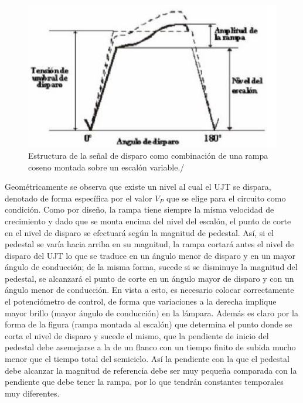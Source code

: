 \documentclass{article}
\begin{document}
\begin{figure}[h]
 \begin{center}
	\includegraphics[scale=0.8]{imagenes/fig8.jpg} 
	\caption{Estructura de la señal de disparo como combinación de una rampa coseno montada sobre un escalón variable./ }\label{fig:fig8}
 \end{center}
\end{figure}


Geométricamente se observa que existe un nivel al cual el UJT se dispara, denotado de forma específica por el valor $V_P$ que se elige para el circuito como condición. Como por diseño, la rampa tiene siempre la misma velocidad de crecimiento y dado que se monta encima del nivel del escalón, el punto de corte en el nivel de disparo se efectuará según la magnitud de pedestal. Así, si el pedestal se varía hacia arriba en su magnitud, la rampa cortará antes el nivel de disparo del UJT lo que se traduce en un ángulo menor de disparo y en un mayor ángulo de conducción; de la misma forma, sucede si se disminuye la magnitud del pedestal, se alcanzará el punto de corte en un ángulo mayor de disparo y con un ángulo menor de conducción. En vista a esto, es necesario colocar correctamente el potenciómetro de control, de forma que variaciones a la derecha implique mayor brillo (mayor ángulo de conducción) en la lámpara. Además es claro por la forma de la figura (rampa montada al escalón) que determina el punto donde se corta el nivel de disparo y sucede el mismo, que la pendiente de inicio del pedestal debe asemejarse a la de un flanco con un tiempo finito de subida mucho menor que el tiempo total del semiciclo. Así la pendiente con la que el pedestal debe alcanzar la magnitud de referencia debe ser muy pequeña comparada con la pendiente que debe tener la rampa, por lo que tendrán constantes temporales muy diferentes.
\end{document}
